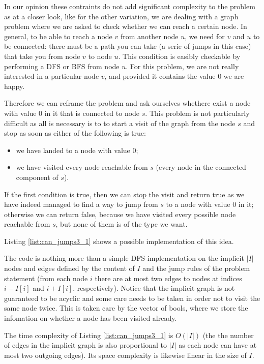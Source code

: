 In our opinion these contraints do not add significant complexity to the problem as at a closer look, like for the other variation, we are dealing with a graph problem where we are asked to check whether we can reach a certain node.
In general, to be able to reach a node $v$ from another node $u$, we need for $v$ and $u$ to be connected: there must be a path you can take (a serie of jumps in this case) that take you from node $v$ to node $u$.
This condition is easibly checkable by performing a DFS or BFS from node $u$.
For this problem, we are not really interested in a particular node $v$, and provided it contains the value $0$ we are happy.

Therefore we can reframe the problem and ask ourselves whethere exist a node with value $0$ in it that is connected to node $s$. 
This problem is not particularly difficult as all is necessary is to to start a visit of the graph from the node $s$ and stop as soon as either of the following is true:
\begin{itemize}
    \item we have landed to a node with value $0$;
    \item we have visited every node reachable from $s$ (every node in the connected component of $s$).
\end{itemize}
If the first condition is true, then we can stop the visit and return true as we have indeed managed to find a way to jump from $s$ to a node with value $0$ in it; otherwise we can return false, because we have visited every possible node reachable from $s$, but none of them is of the type we want.

Listing \ref{list:can_jumps3_1} shows a possible implementation of this idea.



The code is nothing more than a simple DFS implementation on the implicit $|I|$ nodes and edges defined by the content of $I$ and the jump rules of the problem statement (from each node $i$ there are at most two edges to nodes at indices $i-I[i]$ and $i+I[i]$, respectively).
Notice that the implicit graph is not guaranteed to be acyclic and some care needs to be taken in order not to visit the same node twice. This is taken care by the  vector of bools, where we store the infomation on whether a node has been visited already.

The time complexity of Listing \ref{list:can_jumps3_1} is $O(|I|)$ (the the number of edges in the implicit graph is also proportional to $|I|$ as each node can have at most two outgoing edges). Its space complexity is likewise linear in the size of $I$.

